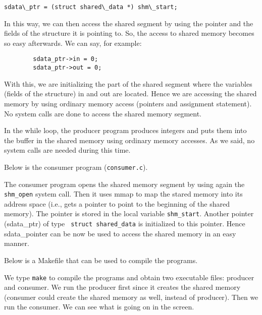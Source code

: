 \begin{Verbatim}  
sdata\_ptr = (struct shared\_data *) shm\_start;
\end{Verbatim}

In this way, we can then access the shared segment by using the
pointer and the fields of the structure it is pointing to. So, the
access to shared memory becomes so easy afterwards. We can say, for
example:

\begin{Verbatim}
        sdata_ptr->in = 0;
        sdata_ptr->out = 0;
\end{Verbatim}

With this, we are initializing the part of the shared segment where
the variables (fields of the structure) in and out are located. Hence
we are accessing the shared memory by using ordinary memory access
(pointers and assignment statement). No system calls are done to
access the shared memory segment.

In the while loop, the producer program produces integers and puts
them into the buffer in the shared memory using ordinary memory
accesses. As we said, no system calls are needed during this time.

Below is the consumer program ({\tt consumer.c}).


The consumer program opens the shared memory segment by using again
the {\tt shm\_open} system call. Then it uses mmap to map the stared
memory into its address space (i.e., gets a pointer to point to the
beginning of the shared memory). The pointer is stored in the local
variable {\tt shm\_start}. Another pointer (sdata\_ptr) of type {\tt
struct shared\_data} is initialized to this pointer. Hence
sdata\_pointer can be now be used to access the shared memory in an
easy manner.

Below is a Makefile that can be used to compile the programs.


We type {\tt make} to compile the programs and obtain two executable
files: producer and consumer. We run the producer first since it
creates the shared memory (consumer could create the shared memory as
well, instead of producer). Then we run the consumer. We can see what
is going on in the screen.

